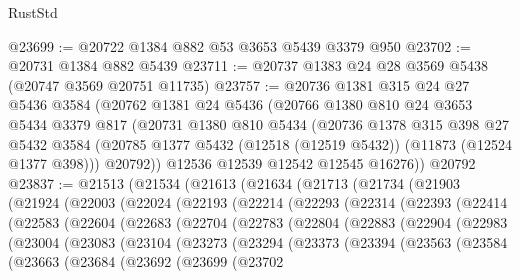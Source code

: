 \begin{lexlean}{RustStd}
\begin{coremodule}
@23699 := @20722 @1384 @882 @53 @3653 @5439 @3379 @950
@23702 := @20731 @1384 @882 @5439
@23711 := @20737 @1383 @24 @28 @3569 @5438 (@20747 @3569 @20751 @11735)
@23757 := @20736
    @1381
    @315
    @24
    @27
    @5436
    @3584
    (@20762
      @1381
      @24
      @5436
      (@20766
        @1380
        @810
        @24
        @3653
        @5434
        @3379
        @817
        (@20731
          @1380
          @810
          @5434
          (@20736
            @1378
            @315
            @398
            @27
            @5432
            @3584
            (@20785 @1377 @5432 (@12518 (@12519 @5432)) (@11873 (@12524 @1377 @398)))
            @20792))
        @12536
        @12539
        @12542
        @12545
        @16276))
    @20792
@23837 := @21513
    (@21534
      (@21613
        (@21634
          (@21713
            (@21734
              (@21903
                (@21924
                  (@22003
                    (@22024
                      (@22193
                        (@22214
                          (@22293
                            (@22314
                              (@22393
                                (@22414
                                  (@22583
                                    (@22604
                                      (@22683
                                        (@22704
                                          (@22783
                                            (@22804
                                              (@22883
                                                (@22904
                                                  (@22983
                                                    (@23004
                                                      (@23083
                                                        (@23104
                                                          (@23273
                                                            (@23294
                                                              (@23373
                                                                (@23394
                                                                  (@23563
                                                                    (@23584
                                                                      (@23663
                                                                        (@23684
                                                                          (@23692
                                                                            (@23699
                                                                              (@23702

\end{coremodule}
\end{lexlean}
